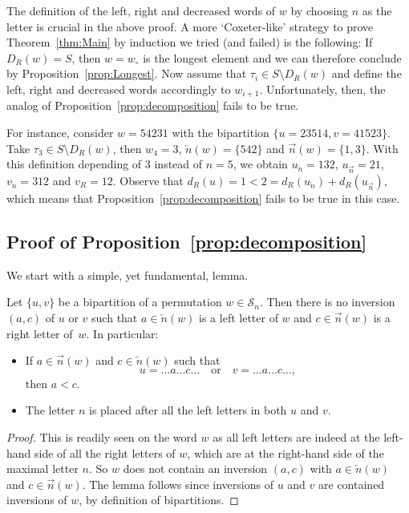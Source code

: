 \documentclass[ALCO,Unicode]{cedram}
\theoremstyle{definition}
\newcommand{\Sym}[1]{\mathcal{S}_{#1}}
\newcommand{\Symn}{\Sym{n}}
\newcommand{\R}{{\overrightarrow{n}}}
\newcommand{\LL}{{\overleftarrow{n}}}
\newcommand{\dd}{d_R}
\begin{document}
\begin{remark} The definition of the left, right and decreased words of $w$ by choosing $n$ as the letter is crucial in the above proof. A more `Coxeter-like' strategy to prove Theorem~\ref{thm:Main} by induction we tried (and failed) is the following:  If $D_R(w)=S$, then $w=w_\circ$ is the longest element and we can therefore conclude by Proposition~\ref{prop:Longest}. Now assume that $\tau_i\in S\setminus D_R(w)$ and define  the left, right and decreased words accordingly to $w_{i+1}$. Unfortunately, then, the analog of Proposition~\ref{prop:decomposition} fails to be true.

 For instance, consider $w=54231$ with the bipartition $\{ u=23514,v=41523\}$. Take $\tau_3\in S\setminus D_R(w)$, then $w_4=3$, $\LL(w)=\{542\}$ and $\R(w)=\{1,3\}$. With this definition depending of $3$ instead of $n=5$, we obtain $u_\LL = 132$, $u_\R=21$, $v_\LL=312$ and $v_R=12$. Observe that $\dd(u)=1<2=d_R(u_\LL)+d_R(u_\R)$, which means that Proposition~\ref{prop:decomposition} fails to be true in this case. 
\end{remark}


\subsection{Proof of Proposition~\ref{prop:decomposition}}

We start with a simple, yet fundamental, lemma.

\begin{lemm}
\label{lem:right-left-inversions}\label{rem:n-after}
Let $\lbrace u, v \rbrace$ be a bipartition of a permutation $w \in \Symn$. Then there is no inversion $(a,c)$ of $u$ or $v$ such that $a\in \LL(w)$ is a left letter of $w$ and $c\in\R(w)$ is a right letter of~$w$.
In particular:
\begin{itemize}
\item If $a\in\R(w)$ and $c \in \LL(w)$ such that 
$$
u=\dots a\dots c\dots\quad \textrm{or}\quad v=\dots a\dots c\dots,
$$ 
then $a<c$.
\item The letter $n$ is placed after all the left letters in both $u$ and $v$.
\end{itemize}
\end{lemm} 

\begin{proof}
This is readily seen  on the word $w$ as all left letters are indeed at the left-hand side of all the right letters of $w$, which are at the right-hand side of the maximal letter $n$. So $w$ does not contain an inversion $(a,c)$ with $a \in \LL(w)$ and $c \in \R(w)$. The lemma follows since inversions of $u$ and $v$ are contained  inversions of $w$, by definition of bipartitions.
\end{proof}
\end{document}
